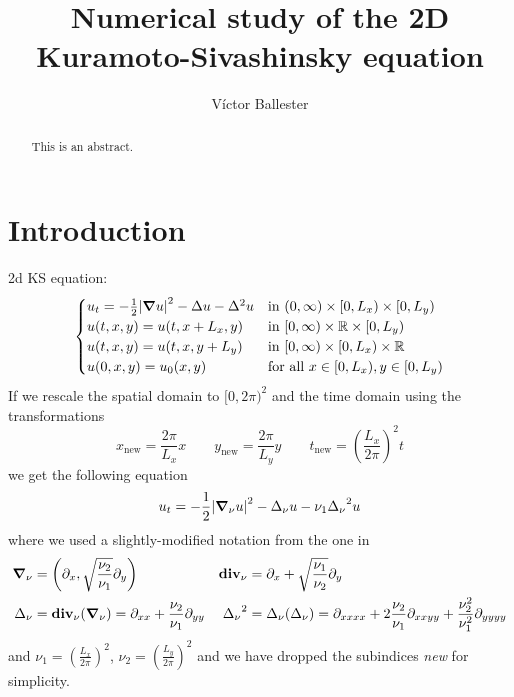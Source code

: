 \documentclass[twoside]{article}
\title{Numerical study of the 2D Kuramoto-Sivashinsky equation}
\author{Víctor Ballester}
\date{\parbox{\linewidth}{\centering
Instabilities and nonlinear phenomena\endgraf
M2 - Applied and Theoretical Mathematics\endgraf
Université Paris-Dauphine \& PSL\endgraf
\today}}
\begin{document}
\maketitle
\begin{abstract}
  This is an abstract.
\end{abstract}
{
\hypersetup{linkcolor=black}
\tableofcontents
}

\section{Introduction}
2d KS equation:
\begin{equation}
  \begin{cases}
    u_t = -\frac{1}{2}\abs{\grad u}^2 - \Delta u - \Delta^2 u & \text{in } (0, \infty) \times [0, L_x) \times [0, L_y) \\
    u(t, x, y) = u(t, x + L_x, y)                                     & \text{in } [0, \infty) \times \mathbb{R} \times [0, L_y)      \\
    u(t, x, y) = u(t, x, y + L_y)                                     & \text{in } [0, \infty) \times [0, L_x) \times \mathbb{R}      \\
    u(0, x, y) = u_0(x, y)                                            & \text{for all } x \in [0, L_x), y \in [0, L_y)
  \end{cases}
\end{equation}
If we rescale the spatial domain to $[0, 2\pi)^2$ and the time domain using the transformations
\begin{equation}
  x_\mathrm{new} = \frac{2\pi}{L_x} x \qquad y_\mathrm{new} = \frac{2\pi}{L_y} y \qquad t_\mathrm{new} = {\left(\frac{L_x}{2 \pi}\right)}^2 t
\end{equation}
we get the following equation
\begin{equation}
  u_t=-\frac{1}{2}\abs{\grad_\nu u}^2-\Delta_\nu u-\nu_1{\Delta_\nu}^2 u
\end{equation}
where we used a slightly-modified notation from the one in \cite{Kalogirou2015}
\begin{align}
  \grad_\nu & = \left(\partial_x , \sqrt{\frac{\nu_2}{\nu_1}} \partial_y
  \right)   & \operatorname{\boldsymbol{\mathrm{div}}}_\nu                                                   & = \partial_x + \sqrt{\frac{\nu_1}{\nu_2}} \partial_y
  \\ \Delta_\nu &= \operatorname{\boldsymbol{\mathrm{div}}}_\nu(\grad_\nu) = \partial_{xx} + \frac{\nu_2}{\nu_1} \partial_{yy} & {\Delta_\nu}^2 &= \Delta_\nu(\Delta_\nu) = \partial_{xxxx} + 2 \frac{\nu_2}{\nu_1} \partial_{xxyy} + \frac{\nu_2^2}{\nu_1^2} \partial_{yyyy}
\end{align}
and $\displaystyle\nu_1 ={\left( \frac{L_x}{2\pi} \right)}^2$, $\displaystyle\nu_2 = {\left( \frac{L_y}{2\pi} \right)}^2$ and we have dropped the subindices \emph{new} for simplicity.
\end{document}
